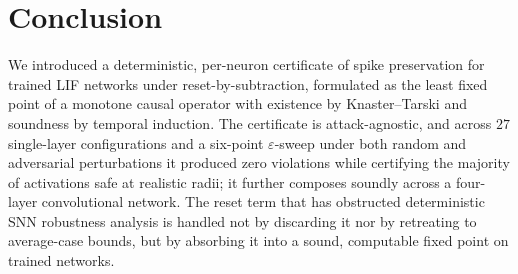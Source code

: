 \documentclass[10pt,twocolumn]{article}
\newcommand{\eps}{\varepsilon}
\begin{document}
\section{Conclusion}

We introduced a deterministic, per-neuron certificate of spike preservation for trained LIF
networks under reset-by-subtraction, formulated as the least fixed point of a monotone causal
operator with existence by Knaster--Tarski and soundness by temporal induction. The certificate
is attack-agnostic, and across $27$ single-layer configurations and a six-point $\eps$-sweep under
both random and adversarial perturbations it produced zero violations while certifying the
majority of activations safe at realistic radii; it further composes soundly across a four-layer
convolutional network. The reset term that has obstructed deterministic SNN robustness analysis
is handled not by discarding it nor by retreating to average-case bounds, but by absorbing it
into a sound, computable fixed point on trained networks.

{\small


}
\end{document}
